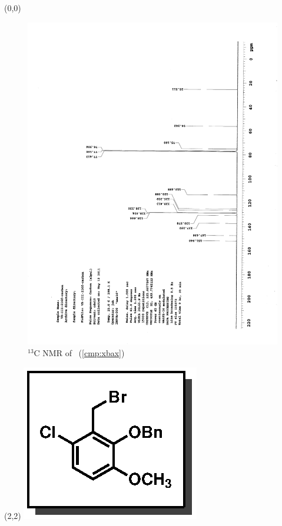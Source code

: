 \clearpage
\begin{textblock}{20}(0,0)
\begin{figure}[htb]
\caption{$^{13}$C NMR of  \CMPxbax\ (\ref{cmp:xbax})}
\includegraphics[scale=0.75, trim = 0mm 0mm 0mm 5mm,
clip]{chp_singlecarbon/images/nmr/xbaxC}
\vspace{-100pt}
\end{figure}
\end{textblock}
\begin{textblock}{1}(2,2)
\includegraphics[scale=0.8, angle=90]{chp_singlecarbon/images/xbax}
\end{textblock}
\clearpage

